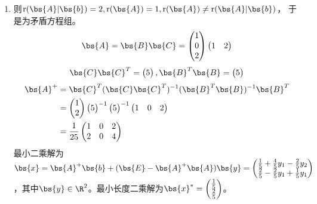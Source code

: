 \documentclass[12pt, a4paper, oneside, UTF8]{ctexbook}
\begin{document}
\begin{solution}
    \begin{enumerate}[label=(\arabic*)]
        \item  则$\mathrm{r}(\bs{A}|\bs{b})=2,\mathrm{r}(\bs{A})=1,\mathrm{r}(\bs{A}) \neq \mathrm{r}(\bs{A}|\bs{b})$，
        于是为矛盾方程组。
        \begin{align*}
            \bs{A}=\bs{B}\bs{C}=\begin{pmatrix}
                1\\
                0\\
                2
            \end{pmatrix}\begin{pmatrix}
                1&2
            \end{pmatrix}
        \end{align*}
        \begin{align*}
            \bs{C}\bs{C}^T=\begin{pmatrix}
                5
            \end{pmatrix},\bs{B}^T\bs{B}=\begin{pmatrix}
                5
            \end{pmatrix}
        \end{align*}
        \begin{align*}
            \bs{A}^+&=\bs{C}^T(\bs{C}\bs{C}^T)^{-1}(\bs{B}^T\bs{B})^{-1}\bs{B}^T\\
            &=\begin{pmatrix}
                1\\
                2
            \end{pmatrix}\begin{pmatrix}
                5
            \end{pmatrix}^{-1}\begin{pmatrix}
                5
            \end{pmatrix}^{-1}\begin{pmatrix}
                1&0&2
            \end{pmatrix}\\
            &=\frac{1}{25}\begin{pmatrix}
                1&0&2\\
                2&0&4
            \end{pmatrix}
        \end{align*}
        最小二乘解为$\bs{x}=\bs{A}^+\bs{b}+(\bs{E}-\bs{A}^+\bs{A})\bs{y}
        =\begin{pmatrix}
            \frac{1}{5}+\frac{4}{5}y_1-\frac{2}{5}y_2\\
            \frac{2}{5}-\frac{2}{5}y_1+\frac{1}{5}y_1
        \end{pmatrix}$，其中$\bs{y}\in \R^2$。最小长度二乘解为$\bs{x}^{*}=\begin{pmatrix}
            \frac{1}{5}\\
            \frac{2}{5}
        \end{pmatrix}$。


\end{enumerate}
\end{solution}
\end{document}
